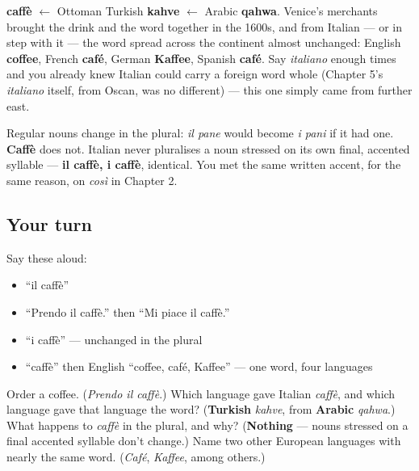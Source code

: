 \begin{cousinweb}
\textbf{caffè} $\leftarrow$ Ottoman Turkish \textbf{kahve} $\leftarrow$ Arabic \textbf{qahwa}. Venice's merchants brought the drink and the word together in the 1600s, and from Italian — or in step with it — the word spread across the continent almost unchanged: English \textbf{coffee}, French \textbf{café}, German \textbf{Kaffee}, Spanish \textbf{café}. Say \emph{italiano} enough times and you already knew Italian could carry a foreign word whole (Chapter 5's \emph{italiano} itself, from Oscan, was no different) — this one simply came from further east.
\end{cousinweb}

\begin{grammarlens}[title={Grammar Lens: a plural that refuses to change}]
Regular nouns change in the plural: \emph{il pane} would become \emph{i pani} if it had one. \textbf{Caffè} does not. Italian never pluralises a noun stressed on its own final, accented syllable — \textbf{il caffè, i caffè}, identical. You met the same written accent, for the same reason, on \emph{così} in Chapter 2.
\end{grammarlens}

\subsection*{Your turn}
Say these aloud:

\begin{itemize}
\raggedright
  \item \textquotedblleft{}il caffè\textquotedblright{}
  \item \textquotedblleft{}Prendo il caffè.\textquotedblright{} then \textquotedblleft{}Mi piace il caffè.\textquotedblright{}
  \item \textquotedblleft{}i caffè\textquotedblright{} — unchanged in the plural
  \item \textquotedblleft{}caffè\textquotedblright{} then English \textquotedblleft{}coffee, café, Kaffee\textquotedblright{} — one word, four languages
\end{itemize}

\begin{tcolorbox}[breakable,colback=teal!4,colframe=teal!35!black,title={Before you move on}]
Order a coffee. (\emph{Prendo il caffè}.) Which language gave Italian \emph{caffè}, and which language gave that language the word? (\textbf{Turkish} \emph{kahve}, from \textbf{Arabic} \emph{qahwa}.) What happens to \emph{caffè} in the plural, and why? (\textbf{Nothing} — nouns stressed on a final accented syllable don't change.) Name two other European languages with nearly the same word. (\emph{Café}, \emph{Kaffee}, among others.)
\end{tcolorbox}
